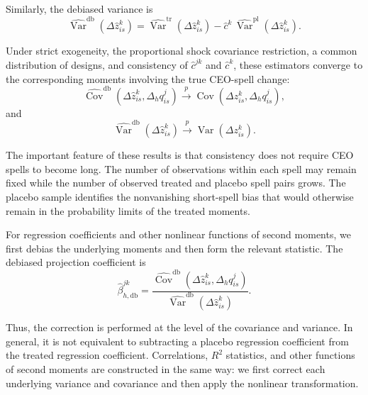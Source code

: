 \documentclass[11pt,a4paper]{article}
\begin{document}
Similarly, the debiased variance is
\begin{equation}
\widehat{\operatorname{Var}}^{\mathrm{db}}\!\left(
\Delta\widehat z_{is}^{k}
\right)
=
\widehat{\operatorname{Var}}^{\mathrm{tr}}\!\left(
\Delta\widehat z_{is}^{k}
\right)
-
\widehat c^k\,
\widehat{\operatorname{Var}}^{\mathrm{pl}}\!\left(
\Delta\widehat z_{is}^{k}
\right).
\label{eq:debiased_variance}
\end{equation}

Under strict exogeneity, the proportional shock covariance restriction,
a common distribution of designs, and consistency of $\widehat c^{jk}$ and $\widehat c^{k}$,
these estimators converge to the corresponding moments involving the
true CEO-spell change:
\begin{equation}
\widehat{\operatorname{Cov}}^{\mathrm{db}}\!\left(
\Delta\widehat z_{is}^{k},
\Delta_h q_{is}^{j}
\right)
\overset{p}{\longrightarrow}
\operatorname{Cov}\!\left(
\Delta z_{is}^{k},
\Delta_h q_{is}^{j}
\right),
\label{eq:debiased_covariance_plim}
\end{equation}
and
\begin{equation}
\widehat{\operatorname{Var}}^{\mathrm{db}}\!\left(
\Delta\widehat z_{is}^{k}
\right)
\overset{p}{\longrightarrow}
\operatorname{Var}\!\left(
\Delta z_{is}^{k}
\right).
\label{eq:debiased_variance_plim}
\end{equation}

The important feature of these results is that consistency does not
require CEO spells to become long. The number of observations within
each spell may remain fixed while the number of observed treated and
placebo spell pairs grows. The placebo sample identifies the
nonvanishing short-spell bias that would otherwise remain in the
probability limits of the treated moments.

For regression coefficients and other nonlinear functions of second
moments, we first debias the underlying moments and then form the
relevant statistic. The debiased projection coefficient is
\begin{equation}
\widehat\beta_{h,\mathrm{db}}^{jk}
=
\frac{
\widehat{\operatorname{Cov}}^{\mathrm{db}}\!\left(
\Delta\widehat z_{is}^{k},
\Delta_h q_{is}^{j}
\right)
}{
\widehat{\operatorname{Var}}^{\mathrm{db}}\!\left(
\Delta\widehat z_{is}^{k}
\right)
}.
\label{eq:debiased_beta}
\end{equation}

Thus, the correction is performed at the level of the covariance and
variance. In general, it is not equivalent to subtracting a placebo
regression coefficient from the treated regression coefficient.
Correlations, $R^2$ statistics, and other functions of second moments
are constructed in the same way: we first correct each underlying
variance and covariance and then apply the nonlinear transformation.
\end{document}
